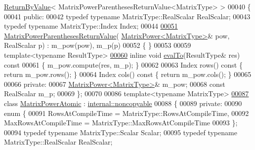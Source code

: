 \begin{DoxyCode}
      \hyperlink{group___core___module_class_eigen_1_1_return_by_value}{ReturnByValue}< MatrixPowerParenthesesReturnValue<MatrixType> >
00040 \{
00041   \textcolor{keyword}{public}:
00042     \textcolor{keyword}{typedef} \textcolor{keyword}{typename} MatrixType::RealScalar RealScalar;
00043     \textcolor{keyword}{typedef} \textcolor{keyword}{typename} MatrixType::Index Index;
00044 
\hyperlink{class_eigen_1_1_matrix_power_parentheses_return_value_ae3a02d943a31427a6dc8c1f60f3367d7}{00051}     \hyperlink{class_eigen_1_1_matrix_power_parentheses_return_value_ae3a02d943a31427a6dc8c1f60f3367d7}{MatrixPowerParenthesesReturnValue}(
      \hyperlink{class_eigen_1_1_matrix_power}{MatrixPower<MatrixType>}& pow, RealScalar p) : m\_pow(pow), m\_p(p)
00052     \{ \}
00053 
00059     \textcolor{keyword}{template}<\textcolor{keyword}{typename} ResultType>
\hyperlink{class_eigen_1_1_matrix_power_parentheses_return_value_a4022dd383b54272e53e52f4f7059579f}{00060}     \textcolor{keyword}{inline} \textcolor{keywordtype}{void} \hyperlink{class_eigen_1_1_matrix_power_parentheses_return_value_a4022dd383b54272e53e52f4f7059579f}{evalTo}(ResultType& res)\textcolor{keyword}{ const}
00061 \textcolor{keyword}{    }\{ m\_pow.compute(res, m\_p); \}
00062 
00063     Index rows()\textcolor{keyword}{ const }\{ \textcolor{keywordflow}{return} m\_pow.rows(); \}
00064     Index cols()\textcolor{keyword}{ const }\{ \textcolor{keywordflow}{return} m\_pow.cols(); \}
00065 
00066   \textcolor{keyword}{private}:
00067     \hyperlink{class_eigen_1_1_matrix_power}{MatrixPower<MatrixType>}& m\_pow;
00068     \textcolor{keyword}{const} RealScalar m\_p;
00069 \};
00070 
00086 \textcolor{keyword}{template}<\textcolor{keyword}{typename} MatrixType>
\hyperlink{class_eigen_1_1_matrix_power_atomic}{00087} \textcolor{keyword}{class }\hyperlink{class_eigen_1_1_matrix_power_atomic}{MatrixPowerAtomic} : \hyperlink{class_eigen_1_1internal_1_1noncopyable}{internal::noncopyable}
00088 \{
00089   \textcolor{keyword}{private}:
00090     \textcolor{keyword}{enum} \{
00091       RowsAtCompileTime = MatrixType::RowsAtCompileTime,
00092       MaxRowsAtCompileTime = MatrixType::MaxRowsAtCompileTime
00093     \};
00094     \textcolor{keyword}{typedef} \textcolor{keyword}{typename} MatrixType::Scalar Scalar;
00095     \textcolor{keyword}{typedef} \textcolor{keyword}{typename} MatrixType::RealScalar RealScalar;

\end{DoxyCode}
